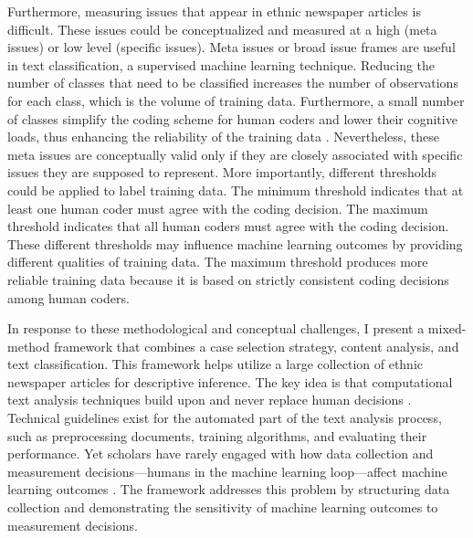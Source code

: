 \documentclass[12 pt]{article}
\begin{document}
Furthermore, measuring issues that appear in ethnic newspaper articles is difficult. These issues could be conceptualized and measured at a high (meta issues) or low level (specific issues). Meta issues or broad issue frames are useful in text classification, a supervised machine learning technique. Reducing the number of classes that need to be classified increases the number of observations for each class, which is the volume of training data. Furthermore, a small number of classes simplify the coding scheme for human coders and lower their cognitive loads, thus enhancing the reliability of the training data \citep{mikhaylov2012coder}. Nevertheless, these meta issues are conceptually valid only if they are closely associated with specific issues they are supposed to represent. More importantly, different thresholds could be applied to label training data. The minimum threshold indicates that at least one human coder must agree with the coding decision. The maximum threshold indicates that all human coders must agree with the coding decision. These different thresholds may influence machine learning outcomes by providing different qualities of training data. The maximum threshold produces more reliable training data because it is based on strictly consistent coding decisions among human coders. 

In response to these methodological and conceptual challenges, I present a mixed-method framework that combines a case selection strategy, content analysis, and text classification. This framework helps utilize a large collection of ethnic newspaper articles for descriptive inference. The key idea is that computational text analysis techniques build upon and never replace human decisions \citep[268]{grimmer2013text}. Technical guidelines exist for the automated part of the text analysis process, such as preprocessing documents, training algorithms, and evaluating their performance. Yet scholars have rarely engaged with how data collection and measurement decisions---humans in the machine learning loop---affect machine learning outcomes \citep{mikhaylov2012coder, gitelman2013raw, geiger2020garbage}. The framework addresses this problem by structuring data collection and demonstrating the sensitivity of machine learning outcomes to measurement decisions. 
\end{document}
